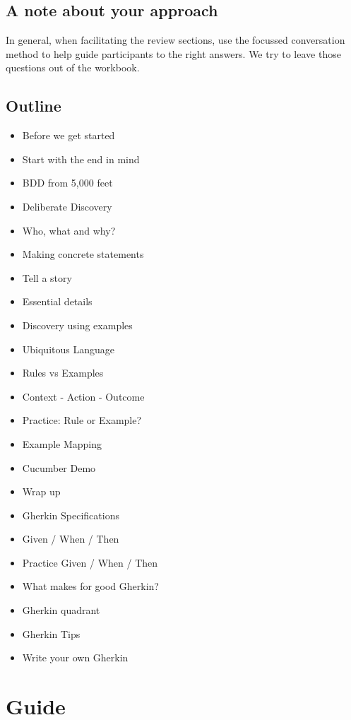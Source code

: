 \section*{A note about your approach}

In general, when facilitating the review sections, use the focussed conversation method to help guide participants to the right answers. We try to leave those questions out of the workbook.

\section*{Outline}

\begin{itemize}
    \item Before we get started
    \item Start with the end in mind
    \item BDD from 5,000 feet
    \item Deliberate Discovery
    \item Who, what and why?
    \item Making concrete statements
    \item Tell a story
    \item Essential details
    \item Discovery using examples
    \item Ubiquitous Language
    \item Rules vs Examples
    \item Context - Action - Outcome
    \item Practice: Rule or Example?
    \item Example Mapping
    \item Cucumber Demo
    \item Wrap up
    \item Gherkin Specifications
    \item Given / When / Then
    \item Practice Given / When / Then
    \item What makes for good Gherkin?
    \item Gherkin quadrant
    \item Gherkin Tips
    \item Write your own Gherkin
\end{itemize}

\chapter*{Guide}

